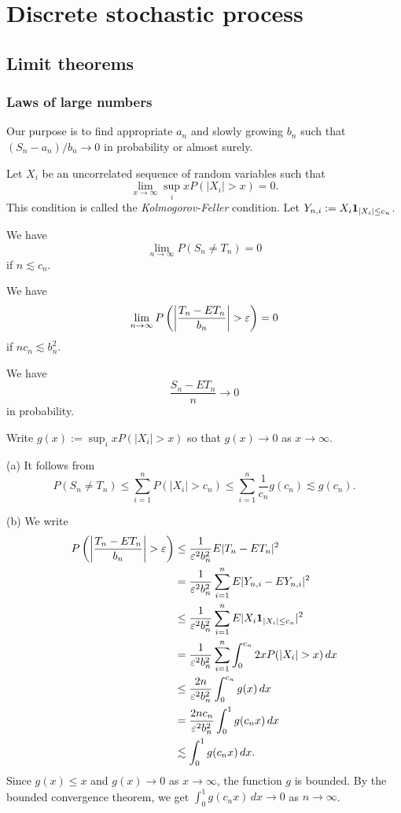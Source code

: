 \documentclass{../note}
\begin{document}
\part{Discrete stochastic process}


\chapter{Limit theorems}

\section{Laws of large numbers}


Our purpose is to find appropriate $a_n$ and slowly growing $b_n$ such that $(S_n-a_n)/b_n\to0$ in probability or almost surely.


\begin{prb}
Let $X_i$ be an uncorrelated sequence of random variables such that
\[\lim_{x\to\infty}\sup_ixP(|X_i|>x)=0.\]
This condition is called the \emph{Kolmogorov-Feller} condition.
Let $Y_{n,i}:=X_i\mathbf{1}_{|X_i|\le c_n}$.
\begin{parts}
\item We have
\[\lim_{n\to\infty}P(S_n\ne T_n)=0\]
if $n\lesssim c_n$.
\item We have
\[\lim_{n\to\infty}P\left(\left|\frac{T_n-ET_n}{b_n}\right|>\e\right)=0\]
if $nc_n\lesssim b_n^2$.
\item We have
\[\frac{S_n-ET_n}n\to0\]
in probability.
\end{parts}
\end{prb}
\begin{pf}
Write $g(x):=\sup_ixP(|X_i|>x)$ so that $g(x)\to0$ as $x\to\infty$.

(a)
It follows from
\[P(S_n\ne T_n)\le\sum_{i=1}^nP(|X_i|>c_n)\le\sum_{i=1}^n\frac1{c_n}g(c_n)\lesssim g(c_n).\]

(b)
We write
\begin{align*}
P\left(\left|\frac{T_n-ET_n}{b_n}\right|>\e\right)
&\le\frac1{\e^2b_n^2}E|T_n-ET_n|^2\\
&=\frac1{\e^2b_n^2}\sum_{i=1}^nE|Y_{n,i}-EY_{n,i}|^2\\
&\le\frac1{\e^2b_n^2}\sum_{i=1}^nE|X_i\1_{|X_i|\le c_n}|^2\\
&=\frac1{\e^2b_n^2}\sum_{i=1}^n\int_0^{c_n}2xP(|X_i|>x)\,dx\\
&\le\frac{2n}{\e^2b_n^2}\int_0^{c_n}g(x)\,dx\\
&=\frac{2nc_n}{\e^2b_n^2}\int_0^1g(c_nx)\,dx\\
&\lesssim\int_0^1g(c_nx)\,dx.
\end{align*}
Since $g(x)\le x$ and $g(x)\to0$ as $x\to\infty$, the function $g$ is bounded.
By the bounded convergence theorem, we get $\int_0^1g(c_nx)\,dx\to0$ as $n\to\infty$.
\end{pf}
\end{document}
